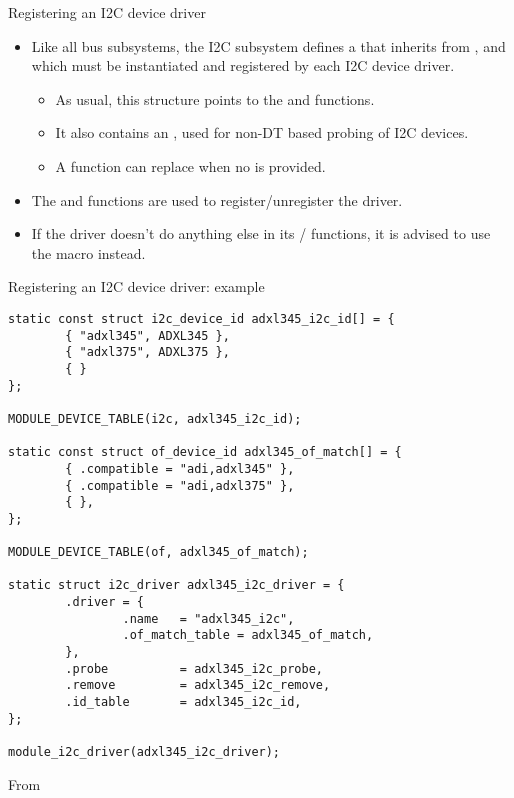 \begin{frame}{Registering an I2C device driver}
  \begin{itemize}
  \item Like all bus subsystems, the I2C subsystem defines a
     that inherits from
    , and which must be instantiated and
    registered by each I2C device driver.
    \begin{itemize}
    \item As usual, this structure points to the  and
       functions.
    \item It also contains an , used for non-DT based
      probing of I2C devices.
    \item A  function can replace 
      when no  is provided.
    \end{itemize}
  \item The  and  functions
    are used to register/unregister the driver.
  \item If the driver doesn't do anything else in its
    / functions, it is advised to use
    the  macro instead.
  \end{itemize}
\end{frame}

\begin{frame}[fragile]{Registering an I2C device driver: example}
  \begin{block}{}
  \begin{verbatim}
static const struct i2c_device_id adxl345_i2c_id[] = {
        { "adxl345", ADXL345 },
        { "adxl375", ADXL375 },
        { }
};

MODULE_DEVICE_TABLE(i2c, adxl345_i2c_id);

static const struct of_device_id adxl345_of_match[] = {
        { .compatible = "adi,adxl345" },
        { .compatible = "adi,adxl375" },
        { },
};

MODULE_DEVICE_TABLE(of, adxl345_of_match);

static struct i2c_driver adxl345_i2c_driver = {
        .driver = {
                .name   = "adxl345_i2c",
                .of_match_table = adxl345_of_match,
        },
        .probe          = adxl345_i2c_probe,
        .remove         = adxl345_i2c_remove,
        .id_table       = adxl345_i2c_id,
};

module_i2c_driver(adxl345_i2c_driver);
\end{verbatim}
\end{block}
\small
From 
\end{frame}

